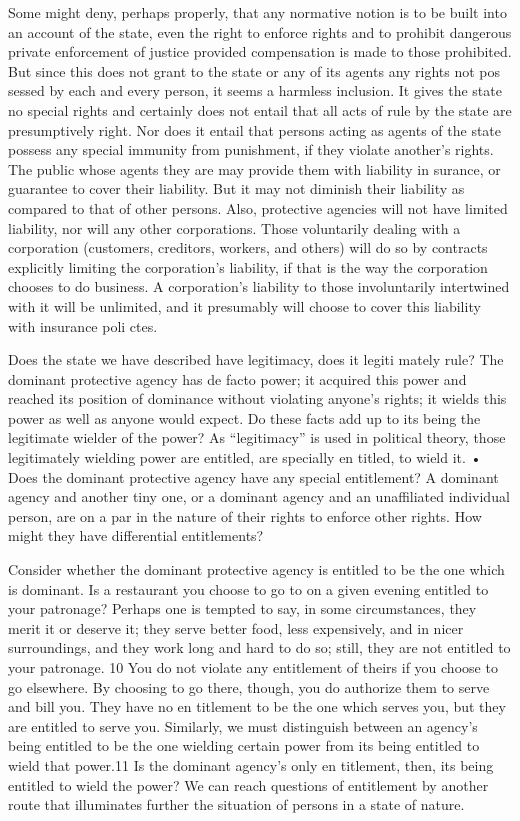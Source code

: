 \documentclass[11pt,openany]{book}
\begin{document}
Some might deny, perhaps properly, that any normative notion is to be built into an account of the state, even the right to enforce rights and to prohibit dangerous private enforcement of justice provided compensation is made to those prohibited. But since this does not grant to the state or any of its agents any rights not pos sessed by each and every person, it seems a harmless inclusion. It gives the state no special rights and certainly does not entail that all acts of rule by the state are presumptively right. Nor does it entail that persons acting as agents of the state possess any special immunity from punishment, if they violate another's rights. The public whose agents they are may provide them with liability in surance, or guarantee to cover their liability. But it may not diminish their liability as compared to that of other persons. Also, protective agencies will not have limited liability, nor will any other corporations. Those voluntarily dealing with a corporation (customers, creditors, workers, and others) will do so by contracts explicitly limiting the corporation's liability, if that is the way the corporation chooses to do business. A corporation's liability to those involuntarily intertwined with it will be unlimited, and it presumably will choose to cover this liability with insurance poli ctes. 

Does the state we have described have legitimacy, does it legiti mately rule? The dominant protective agency has de facto power; it acquired this power and reached its position of dominance without violating anyone's rights; it wields this power as well as anyone would expect. Do these facts add up to its being the legitimate wielder of the power? As ``legitimacy'' is used in political theory, those legitimately wielding power are entitled, are specially en titled, to wield it. • Does the dominant protective agency have any special entitlement? A dominant agency and another tiny one, or a dominant agency and an unaffiliated individual person, are on a par in the nature of their rights to enforce other rights. How might they have differential entitlements? 

Consider whether the dominant protective agency is entitled to be the one which is dominant. Is a restaurant you choose to go to on a given evening entitled to your patronage? Perhaps one is tempted to say, in some circumstances, they merit it or deserve it; they serve better food, less expensively, and in nicer surroundings, and they work long and hard to do so; still, they are not entitled to your patronage. 10 You do not violate any entitlement of theirs if you choose to go elsewhere. By choosing to go there, though, you do authorize them to serve and bill you. They have no en titlement to be the one which serves you, but they are entitled to serve you. Similarly, we must distinguish between an agency's being entitled to be the one wielding certain power from its being entitled to wield that power.11 Is the dominant agency's only en titlement, then, its being entitled to wield the power? We can reach questions of entitlement by another route that illuminates further the situation of persons in a state of nature. 
\end{document}
